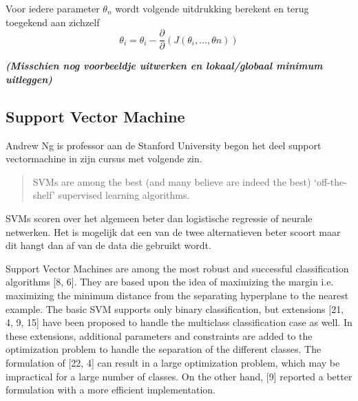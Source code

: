 Voor iedere parameter $\theta_{n}$ wordt volgende uitdrukking berekent en terug toegekend aan zichzelf
$$
\theta_{i} = \theta_{i} - \frac{\partial}{\partial}(J(\theta_{i}, ... , \theta{n}))
$$

\textbf{\textit{(Misschien nog voorbeeldje uitwerken en lokaal/globaal minimum uitleggen)}}



\subsection{Support Vector Machine}
\label{sec:Support-Vector-Machine}
Andrew Ng is professor aan de Stanford University begon het deel support vectormachine in zijn cursus \autocite{cursusAndrewNg} met volgende zin.
\begin{quote}
	SVMs are among the best (and many believe are indeed the best) ‘off-the-shelf’ supervised learning algorithms.
\end{quote}

SVMs scoren over het algemeen beter dan logistische regressie of neurale netwerken. Het is mogelijk dat een van de twee alternatieven beter scoort maar dit hangt dan af van de data die gebruikt wordt. 



Support Vector Machines are among the most robust and successful classification algorithms [8, 6]. They are based upon the idea of maximizing the margin i.e. maximizing the minimum distance from the separating hyperplane to the nearest example. The basic SVM supports only binary classification, but extensions [21, 4, 9, 15] have been proposed to handle the multiclass classification case as well. In these extensions, additional parameters and constraints are added to the optimization problem to handle the separation of the different classes. The formulation of [22, 4] can result in a large optimization problem, which may be impractical for a large number of classes. On the other hand, [9] reported a better formulation with a more efficient implementation.


